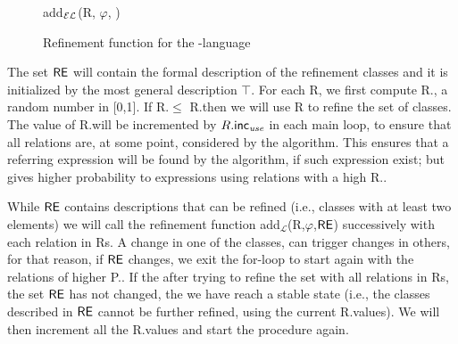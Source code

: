 \begin{figure}[t]
\small
\centering
\begin{algorithm}[H]
\dontprintsemicolon
\caption{add$_\mathcal{EL}$(R, $\varphi$, \RE)} \label{algo:bisim-add-el}

\end{algorithm}
\vspace*{-.5cm}\caption{Refinement function for the \el-language}\label{fig:algo2}
\end{figure}

The set $\textsf{RE}$ will contain the formal description of the refinement classes and it is initialized by the most general description $\top$.  
For each R, we first compute R.\randomuse, a random number in [0,1].  If R.\randomuse $\le$ R.\puse then we will use R to refine the set of classes.  The value of R.\puse will be incremented by $R.\textsf{inc}_\emph{use}$ in each main loop, to ensure that all relations are, at some point, considered by the algorithm.  This ensures that a referring expression will be found by the algorithm, if such expression exist; but gives higher probability to expressions using relations with a high R.\puse. 
 
While $\textsf{RE}$ contains descriptions that can be refined (i.e., classes with at least two elements) we will call the refinement function add$_\mathcal{L}$(R,$\varphi$,$\textsf{RE}$) successively with each relation in Rs. A change in one of the classes, can trigger changes in others, for that reason, if $\textsf{RE}$ changes, we exit the for-loop to start again with the relations of higher P.\puse. If the after trying to refine the set with all relations in Rs, the set $\textsf{RE}$ has not changed, the we have reach a stable state (i.e., the classes described in $\textsf{RE}$ cannot be further refined, using the current R.\puse values). We will then increment all the R.\puse values and start the procedure again. 

